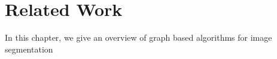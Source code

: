 \chapter{Related Work} \label{ch:reated_work}

In this chapter, we give an overview of graph based algorithms
for image segmentation 

% 

 

 

% 

% 

 




